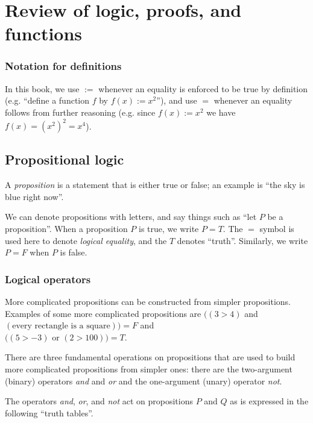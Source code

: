 \chapter{Review of logic, proofs, and functions}
\label{ch::logic_pf_fns}

\subsection*{Notation for definitions}

In this book, we use $:=$ whenever an equality is enforced to be true by definition (e.g. ``define a function $f$ by $f(x) := x^2$''), and use $=$ whenever an equality follows from further reasoning (e.g. since $f(x) := x^2$ we have $f(x) = (x^2)^2 = x^4$).

\section{Propositional logic}

A \textit{proposition} is a statement that is either true or false; an example is ``the sky is blue right now''.

We can denote propositions  with letters, and say things such as ``let $P$ be a proposition''. When a proposition $P$ is true, we write $P = T$. The $=$ symbol is used here to denote \textit{logical equality}, and the $T$ denotes ``truth''. Similarly, we write $P = F$ when $P$ is false.

\subsection*{Logical operators}

More complicated propositions can be constructed from simpler propositions. Examples of some more complicated propositions are $\Big((3 > 4)$ and $(\text{every rectangle is a square}) \Big) = F$ and \\ $\Big((5 > -3) \text{ or } (2 > 100)\Big) = T$.

There are three fundamental operations on propositions that are used to build more complicated propositions from simpler ones: there are the two-argument (binary) operators \textit{and} and \textit{or} and the one-argument (unary) operator \textit{not}.

The operators \textit{and}, \textit{or}, and \textit{not} act on propositions $P$ and $Q$ as is expressed in the following ``truth tables''.

